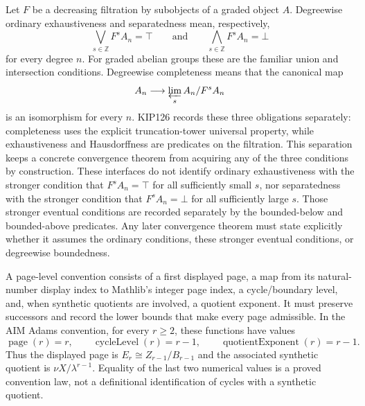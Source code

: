 \begin{definition}
  \label{def:complete-separated-filtration}
  \leanok
  Let $F$ be a decreasing filtration by subobjects of a graded object $A$.
  Degreewise ordinary exhaustiveness and separatedness mean, respectively,
  \[
    \bigvee_{s\in\mathbb Z}F^sA_n=\top
    \qquad\text{and}\qquad
    \bigwedge_{s\in\mathbb Z}F^sA_n=\bot
  \]
  for every degree $n$.  For graded abelian groups these are the familiar
  union and intersection conditions.  Degreewise completeness means that the
  canonical map
  \[
    A_n\longrightarrow\varprojlim_s A_n/F^sA_n
  \]
  is an isomorphism for every $n$.  KIP126 records these three obligations
  separately: completeness uses the explicit truncation-tower universal
  property, while exhaustiveness and Hausdorffness are predicates on the
  filtration.  This separation keeps a concrete convergence theorem from
  acquiring any of the three conditions by construction.  These interfaces
  do not identify ordinary
  exhaustiveness with the stronger condition that $F^sA_n=\top$ for all
  sufficiently small $s$, nor separatedness with the stronger condition that
  $F^sA_n=\bot$ for all sufficiently large $s$.  Those stronger eventual
  conditions are recorded separately by the bounded-below and bounded-above
  predicates.  Any later convergence theorem must
  state explicitly whether it assumes the ordinary conditions, these stronger
  eventual conditions, or degreewise boundedness.
\end{definition}

\begin{definition}
  \label{def:ss-page-level}
  \leanok
  A page-level convention consists of a first displayed page, a map from its
  natural-number display index to Mathlib's integer page index, a
  cycle/boundary level, and, when synthetic quotients are involved, a quotient
  exponent.  It must preserve successors and record the lower bounds that make
  every page admissible.  In the AIM Adams convention, for every $r\ge2$,
  these functions have values
  \[
    \operatorname{page}(r)=r,\qquad
    \operatorname{cycleLevel}(r)=r-1,\qquad
    \operatorname{quotientExponent}(r)=r-1.
  \]
  Thus the displayed page is $E_r\cong Z_{r-1}/B_{r-1}$ and the associated
  synthetic quotient is $\nu X/\lambda^{r-1}$.  Equality of the last two
  numerical values is a proved convention law, not a definitional
  identification of cycles with a synthetic quotient.
\end{definition}

